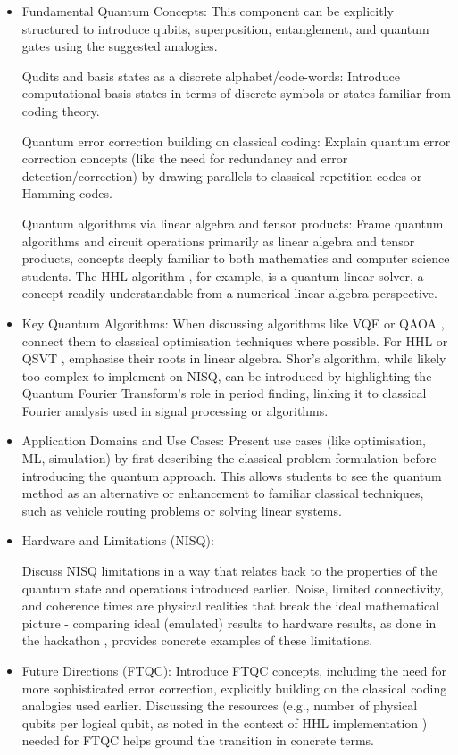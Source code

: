 \documentclass[11pt,a4paper]{article}
\begin{document}
\begin{itemize}	
	
\item Fundamental Quantum Concepts: This component
can be explicitly structured to introduce qubits, superposition, entanglement, and quantum gates using the suggested analogies.
 
Qudits and basis states as a discrete alphabet/code-words: Introduce computational basis states in terms of discrete symbols or states familiar from coding theory.

Quantum error correction building on classical coding: Explain quantum error correction concepts (like the need for redundancy and error detection/correction) by drawing parallels to classical repetition codes or Hamming codes.

Quantum algorithms via linear algebra and tensor products: Frame quantum algorithms and circuit operations primarily as linear algebra and tensor products, concepts deeply familiar to both mathematics and computer science students. The HHL algorithm
, for example, is a quantum linear solver, a concept readily understandable from a numerical linear algebra perspective.

\item Key Quantum Algorithms: When discussing algorithms like VQE or QAOA
, connect them to classical optimisation techniques where possible. For HHL or QSVT
, emphasise their roots in linear algebra. Shor's algorithm, while likely too complex to implement on NISQ, can be introduced by highlighting the Quantum Fourier Transform's role in period finding, linking it to classical Fourier analysis used in signal processing or algorithms.

\item Application Domains and Use Cases: Present use cases (like optimisation, ML, simulation)
by first describing the classical problem formulation before introducing the quantum approach. This allows students to see the quantum method as an alternative or enhancement to familiar classical techniques, such as vehicle routing problems or solving linear systems.

\item Hardware and Limitations (NISQ): 

Discuss NISQ limitations
in a way that relates back to the properties of the quantum state and operations introduced earlier. Noise, limited connectivity, and coherence times are physical realities that break the ideal mathematical picture - comparing ideal (emulated) results to hardware results, as done in the hackathon
, provides concrete examples of these limitations.

\item Future Directions (FTQC): Introduce FTQC concepts, including the need for more sophisticated error correction, explicitly building on the classical coding analogies used earlier. Discussing the resources (e.g., number of physical qubits per logical qubit, as noted in the context of HHL implementation
) needed for FTQC helps ground the transition in concrete terms.

\end{itemize}	
\end{document}
